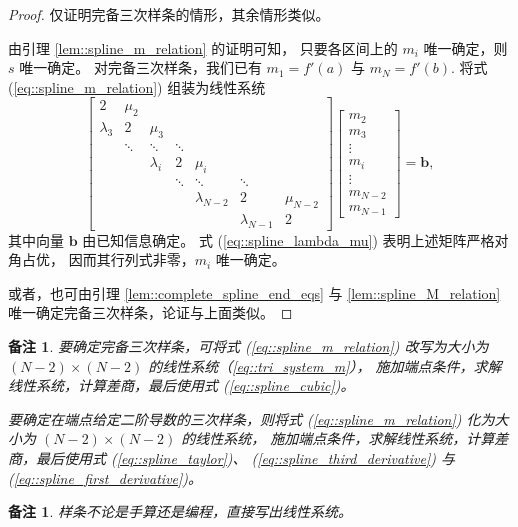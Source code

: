 \documentclass[a4paper]{ctexart}
\newtheorem{remark}{备注}
\newtheorem*{remark*}{备注}
\numberwithin{theorem}{section}
\numberwithin{equation}{section}
\numberwithin{figure}{section}
\numberwithin{remark}{section}
\begin{document}
\begin{proof}
仅证明完备三次样条的情形，其余情形类似。

由引理 \ref{lem::spline_m_relation} 的证明可知，
只要各区间上的 $m_i$ 唯一确定，则 $s$ 唯一确定。
对完备三次样条，我们已有 $m_1=f'(a)$ 与 $m_N=f'(b)$. 
将式 (\ref{eq::spline_m_relation}) 组装为线性系统
\begin{equation}
    \label{eq::tri_system_m}
\begin{bmatrix}
2 & \mu_2 \\
\lambda_3 & 2 & \mu_3 \\
& \ddots & \ddots & \ddots \\
& & \lambda_i & 2 & \mu_i \\
& & & \ddots & \ddots & \ddots \\
& & & & \lambda_{N-2} & 2 & \mu_{N-2} \\
& & & & & \lambda_{N-1} & 2
\end{bmatrix}
\begin{bmatrix}
m_2\\ m_3\\ \vdots\\ m_i\\ \vdots\\ m_{N-2}\\ m_{N-1}
\end{bmatrix}
=\mathbf{b},
\end{equation}
其中向量 $\mathbf{b}$ 由已知信息确定。
式 (\ref{eq::spline_lambda_mu}) 表明上述矩阵严格对角占优，
因而其行列式非零，$m_i$ 唯一确定。

或者，也可由引理 \ref{lem::complete_spline_end_eqs} 与 
\ref{lem::spline_M_relation} 唯一确定完备三次样条，论证与上面类似。
\end{proof}

\begin{remark}
    \label{rem::how_to_determine_cubic_splines}
要确定完备三次样条，可将式 (\ref{eq::spline_m_relation}) 
改写为大小为 $(N-2)\times(N-2)$ 的线性系统（\ref{eq::tri_system_m}），
施加端点条件，求解线性系统，计算差商，最后使用式 (\ref{eq::spline_cubic})。

要确定在端点给定二阶导数的三次样条，则将式 (\ref{eq::spline_m_relation}) 
化为大小为 $(N-2)\times(N-2)$ 的线性系统，
施加端点条件，求解线性系统，计算差商，最后使用式 (\ref{eq::spline_taylor})、
(\ref{eq::spline_third_derivative}) 与 (\ref{eq::spline_first_derivative})。
\end{remark}

\begin{remark*}
    样条不论是手算还是编程，直接写出线性系统。
\end{remark*}
\end{document}
